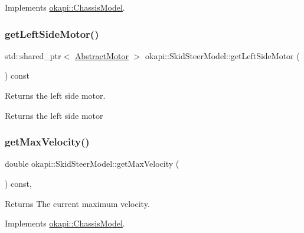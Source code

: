 Implements \mbox{\hyperlink{classokapi_1_1ChassisModel_ae39e8ccd15b6f84e32cd21fe99bdd6c9}{okapi\+::\+Chassis\+Model}}.

\mbox{\label{classokapi_1_1SkidSteerModel_a3f1813ada8205396c35abccbc0c9ff21}} 
\subsubsection{\texorpdfstring{getLeftSideMotor()}{getLeftSideMotor()}}
{\footnotesize\ttfamily std\+::shared\+\_\+ptr$<$ \mbox{\hyperlink{classokapi_1_1AbstractMotor}{Abstract\+Motor}} $>$ okapi\+::\+Skid\+Steer\+Model\+::get\+Left\+Side\+Motor (\begin{DoxyParamCaption}{ }\end{DoxyParamCaption}) const}

Returns the left side motor.

\begin{DoxyReturn}{Returns}
the left side motor 
\end{DoxyReturn}
\mbox{\label{classokapi_1_1SkidSteerModel_a7e2fcfb65e940ea4d71780966b4b5b68}} 
\subsubsection{\texorpdfstring{getMaxVelocity()}{getMaxVelocity()}}
{\footnotesize\ttfamily double okapi\+::\+Skid\+Steer\+Model\+::get\+Max\+Velocity (\begin{DoxyParamCaption}{ }\end{DoxyParamCaption}) const\hspace{0.3cm}{\ttfamily [override]}, {\ttfamily [virtual]}}

\begin{DoxyReturn}{Returns}
The current maximum velocity. 
\end{DoxyReturn}


Implements \mbox{\hyperlink{classokapi_1_1ChassisModel_ab45dd7430636ed1c1dee25dae6df5d46}{okapi\+::\+Chassis\+Model}}.

\mbox{\label{classokapi_1_1SkidSteerModel_ad4849d18c3a244eb60e1056860a3c4cf}} 
